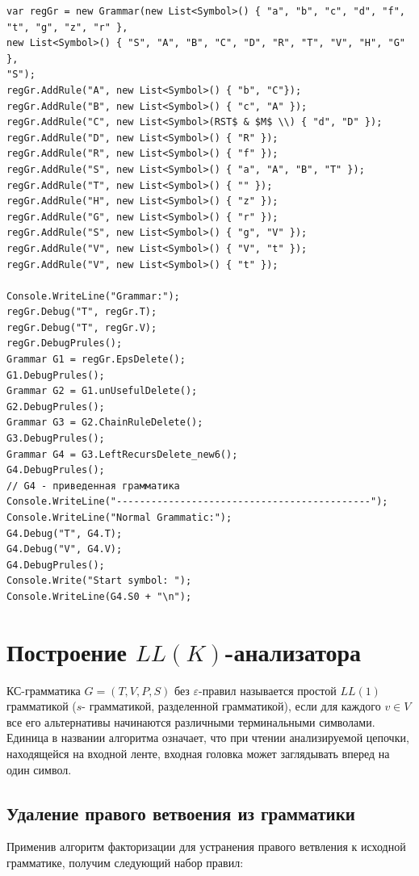 \documentclass[12pt]{extarticle}
\begin{document}
	\begin{lstlisting}
var regGr = new Grammar(new List<Symbol>() { "a", "b", "c", "d", "f", "t", "g", "z", "r" },
new List<Symbol>() { "S", "A", "B", "C", "D", "R", "T", "V", "H", "G" },
"S");
regGr.AddRule("A", new List<Symbol>() { "b", "C"});
regGr.AddRule("B", new List<Symbol>() { "c", "A" });
regGr.AddRule("C", new List<Symbol>(RST$ & $M$ \\) { "d", "D" });
regGr.AddRule("D", new List<Symbol>() { "R" });
regGr.AddRule("R", new List<Symbol>() { "f" });
regGr.AddRule("S", new List<Symbol>() { "a", "A", "B", "T" });
regGr.AddRule("T", new List<Symbol>() { "" });
regGr.AddRule("H", new List<Symbol>() { "z" });
regGr.AddRule("G", new List<Symbol>() { "r" });
regGr.AddRule("S", new List<Symbol>() { "g", "V" });
regGr.AddRule("V", new List<Symbol>() { "V", "t" });
regGr.AddRule("V", new List<Symbol>() { "t" });

Console.WriteLine("Grammar:");
regGr.Debug("T", regGr.T);
regGr.Debug("T", regGr.V);
regGr.DebugPrules();
Grammar G1 = regGr.EpsDelete();
G1.DebugPrules();
Grammar G2 = G1.unUsefulDelete();
G2.DebugPrules();
Grammar G3 = G2.ChainRuleDelete();
G3.DebugPrules();
Grammar G4 = G3.LeftRecursDelete_new6();
G4.DebugPrules();
// G4 - приведенная грамматика
Console.WriteLine("--------------------------------------------");
Console.WriteLine("Normal Grammatic:");
G4.Debug("T", G4.T);
G4.Debug("V", G4.V);
G4.DebugPrules();
Console.Write("Start symbol: ");
Console.WriteLine(G4.S0 + "\n");		
	\end{lstlisting}	
	
	\section{Построение $LL(K)$-анализатора}
	
	КС-грамматика $G = (T, V, P, S)$ без $\varepsilon$-правил называется простой $LL(1)$ грамматикой ($s$-
	грамматикой, разделенной грамматикой), если для каждого $v \in V$ все его альтернативы начинаются различными терминальными символами. Единица в названии алгоритма означает, что при чтении
	анализируемой цепочки, находящейся на входной ленте, входная головка может заглядывать вперед на
	один символ.
	
	\subsection{Удаление правого ветвоения из грамматики}
	
	Применив алгоритм факторизации для устранения правого ветвления к исходной грамматике, получим следующий набор правил:
	
\end{document}
